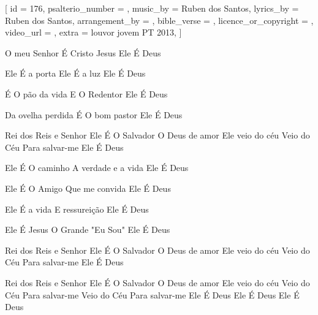 [
    id                     = {176},
    psalterio_number       = {},
    music_by               = {Ruben dos Santos},
    lyrics_by              = {Ruben dos Santos},
    arrangement_by         = {},
    bible_verse            = {},
    licence_or_copyright   = {},
    video_url              = {},
    extra                  = {louvor jovem PT 2013},
]

\beginverse
O meu Senhor 
É Cristo Jesus
Ele É Deus

Ele É a porta
Ele É a luz
Ele É Deus

É O pão da vida
E O Redentor
Ele É Deus

Da ovelha perdida 
É O bom pastor
Ele É Deus
\endverse

\beginchorus
Rei dos Reis e Senhor 
Ele É O Salvador 
O Deus de amor 
Ele veio do céu 
Veio do Céu
Para salvar-me 
Ele É Deus
\endchorus

\beginverse
Ele É O caminho 
A verdade e a vida
Ele É Deus

Ele É O Amigo
Que me convida
Ele É Deus

Ele É a vida
E ressureição
Ele É Deus

Ele É Jesus
O Grande "Eu Sou"
Ele É Deus
\endverse

\beginchorus
Rei dos Reis e Senhor 
Ele É O Salvador 
O Deus de amor 
Ele veio do céu 
Veio do Céu
Para salvar-me 
Ele É Deus
\endchorus


\beginchorus
Rei dos Reis e Senhor 
Ele É O Salvador 
O Deus de amor 
Ele veio do céu 
Veio do Céu
Para salvar-me 
Veio do Céu
Para salvar-me 
Ele É Deus
Ele É Deus
Ele É Deus
\endchorus

\endsong
